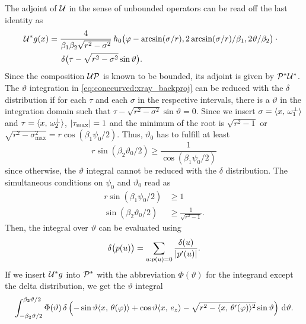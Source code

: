 \documentclass{amsart}
\renewcommand*{\phi}{\varphi}
\begin{document}
%
The adjoint of ${\mathcal{U}}$ in the sense of unbounded operators can be read off the last identity as
%
\begin{align}
 \label{eq:conecurved:coord_op_adjoint}
 \DUALOPU g(x) 
 &= \frac{4}{\beta_1\beta_2\sqrt{r^2 - \sigma^2}}\,
 h_0\big( \phi - \arcsin(\sigma/r), 2\arcsin(\sigma/r)/\beta_1, 2\vartheta/\beta_2 \big) \cdot \phantom{x} \\
 &\hspace{15pt}\delta\big(\tau - \sqrt{r^2 - \sigma^2} \sin\vartheta \big) \notag.
\end{align} 
%
Since the composition ${\mathcal{U}} {\mathcal{P}}$ is known to 
be bounded, its adjoint is given by ${{\mathcal{P}}^*} {{\mathcal{U}}^*}$. The $\vartheta$ integration in \eqref{eq:conecurved:xray_backproj} can be reduced 
with the $\delta$ distribution if for each $\tau$ and each $\sigma$ in the respective intervals, there is a $\vartheta$ in the integration 
domain such that $\tau - \sqrt{r^2 - \sigma^2} \sin\vartheta = 0$. Since we insert $\sigma = \langle x,\,\omega_1^\perp\rangle$ and $\tau = 
\langle x,\,\omega_2^\perp\rangle$, $|\tau_{\text{max}}| = 1$ and the minimum of the root is $\sqrt{r^2 - 1}$ or 
$\sqrt{r^2 - \sigma_{\text{max}}^2} = r\cos(\beta_1\psi_0/2)$. Thus, $\vartheta_0$ has to fulfill at least
%
\begin{equation}
 r\sin(\beta_2\vartheta_0/2) \geq \frac{1}{\cos(\beta_1\psi_0/2)}
\end{equation}
%
%
since otherwise, the $\vartheta$ integral cannot be reduced with the $\delta$ distribution. 
The simultaneous conditions on $\psi_0$ and $\vartheta_0$ read as
%
%
\begin{align}
 r \sin(\beta_1\psi_0/2) &\geq 1 \\
 \sin(\beta_2\vartheta_0/2) &\geq \frac{1}{\sqrt{r^2 - 1}}.
\end{align}
%
Then, the integral over $\vartheta$ can be evaluated using
%
\begin{equation*}
 \delta\big(p(u)\big) = \sum_{u:p(u)=0} \frac{\delta(u)}{|p'(u)|}.
\end{equation*}
%
If we insert ${{\mathcal{U}}^*} g$ into ${{\mathcal{P}}^*}$ with the abbreviation $\Phi(\vartheta)$ for the integrand except the delta distribution, we get 
the $\vartheta$ integral
%
\begin{equation}
 \label{eq:conecurved:theta_integral_delta}
 \int_{-\beta_2\vartheta/2}^{\beta_2\vartheta/2} \Phi(\vartheta)\, 
 \delta\left( -\sin\vartheta \INNER{x}{\theta(\phi)} + \cos\vartheta \INNER{x}{e_z} - \sqrt{r^2 - \INNER{x}{\theta'(\phi)}^2} \sin\vartheta 
 \right)\, \D\vartheta.
\end{equation}
\end{document}
